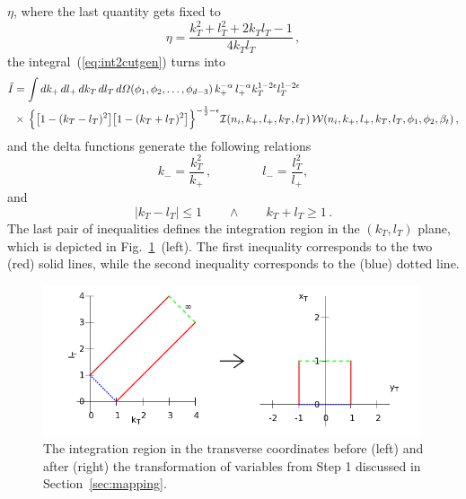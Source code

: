 \documentclass[a4paper,11pt]{article}
\numberwithin{equation}{section}
\begin{document}
$\eta$, where the last quantity gets fixed to
%
\begin{equation}
  \eta = \frac{k_T^2 + l_T^2+ 2 k_T l_T -1}{4 k_T l_T}\,,
\end{equation}
the integral~(\ref{eq:int2cutgen}) turns into
%
\begin{align}
  \tilde I & =
  \int dk_+\, dl_+\, dk_T\, dl_T\, 
  d\Omega(\phi_1, \phi_2, \ldots, \phi_{d-3})\,
  k_+^{-\alpha}\, l_+^{-\alpha} k_T^{1-2\epsilon} l_T^{1-2\epsilon} \,
  \nonumber \\ &
  \times\,
  \Big\{\big[1-(k_T-l_T)^2\big]\big[1-(k_T+l_T)^2\big]
  \Big\}^{-\frac12-\epsilon}
  {\cal I}(n_i, k_+, l_+, k_T, l_T)\,
  {\cal W}(n_i, k_+, l_+, k_T, l_T, \phi_1, \phi_2, \beta_t)\,,
  \label{eq:S2cutgen-deltaint}
\end{align}
%
and the delta functions generate the following relations
%
\begin{equation}
  k_- = \frac{k_T^2}{k_+}\,, \qquad \qquad
  l_- = \frac{l_T^2}{l_+},
  \label{eq:pmrelations}
\end{equation}
%
and
\begin{equation}
  | k_T - l_T | \leq 1
  \qquad \land \qquad
   k_T + l_T  \geq 1\,.
  \label{eq:kTlT-region}
\end{equation}
%
The last pair of inequalities defines the integration region in the $(k_T, l_T)$
plane,  which is depicted in Fig.~\ref{fig:trans-regions}~(left).  The
first inequality corresponds to the two (red) solid lines, while the second
inequality corresponds to the (blue) dotted line.

\begin{figure}[t]
  \begin{center}
    \includegraphics[width=0.99\textwidth]{plots/transverse-phase-space.png}
  \end{center}
  \caption{
  The integration region in the transverse coordinates before (left) and
  after (right) the transformation of variables from Step 1 discussed in
  Section~\ref{sec:mapping}.
  }
  \label{fig:trans-regions}
\end{figure}
\end{document}
